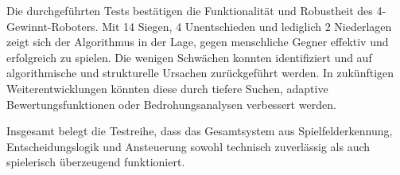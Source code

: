Die durchgeführten Tests bestätigen die Funktionalität und Robustheit des 4-Gewinnt-Roboters. Mit 14 Siegen, 4 Unentschieden und lediglich 2 Niederlagen zeigt sich der Algorithmus in der Lage, gegen menschliche Gegner effektiv und erfolgreich zu spielen. Die wenigen Schwächen konnten identifiziert und auf algorithmische und strukturelle Ursachen zurückgeführt werden. In zukünftigen Weiterentwicklungen könnten diese durch tiefere Suchen, adaptive Bewertungsfunktionen oder Bedrohungsanalysen verbessert werden.

Insgesamt belegt die Testreihe, dass das Gesamtsystem aus Spielfelderkennung, Entscheidungslogik und Ansteuerung sowohl technisch zuverlässig als auch spielerisch überzeugend funktioniert.




